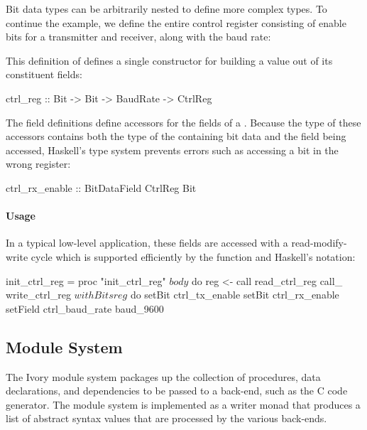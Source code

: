 Bit data types can be arbitrarily nested to define more complex types.
To continue the example, we define the entire control register consisting
of enable bits for a transmitter and receiver, along with the baud rate:

\begin{code}
[ivory|
  bitdata CtrlReg :: Bits 8 = ctrl_reg
    { ctrl_tx_enable  :: Bit
    , ctrl_rx_enable  :: Bit
    , ctrl_baud_rate  :: BaudRate
    } as 0b0000 # ctrl_tx_enable # ctrl_rx_enable
                # ctrl_baud_rate |]
\end{code}

This definition of  defines a single constructor for building
a  value out of its constituent fields:

\begin{code}
ctrl_reg :: Bit -> Bit -> BaudRate -> CtrlReg
\end{code}

The field definitions define accessors for the fields of a
. Because the type of these accessors contains both
the type of the containing bit data and the field being accessed,
Haskell's type system prevents errors such as accessing a bit
in the wrong register:

\begin{code}
ctrl_rx_enable :: BitDataField CtrlReg Bit
\end{code}

\paragraph{Usage}
In a typical low-level application, these fields
are accessed with a read-modify-write cycle which is supported
efficiently by the  function and Haskell's
 notation:

\begin{code}
init_ctrl_reg = proc "init_ctrl_reg" $ body $ do
  reg <- call read_ctrl_reg
  call_ write_ctrl_reg $ withBits reg $ do
    setBit   ctrl_tx_enable
    setBit   ctrl_rx_enable
    setField ctrl_baud_rate baud_9600
\end{code}

\subsection{Module System}
\label{sec:modules}

The Ivory  module system packages up
the collection of procedures, data declarations, and dependencies to be passed
to a back-end, such as the C code generator. The module system is implemented as
a writer monad that produces a list of abstract syntax values that are processed
by the various back-ends.

